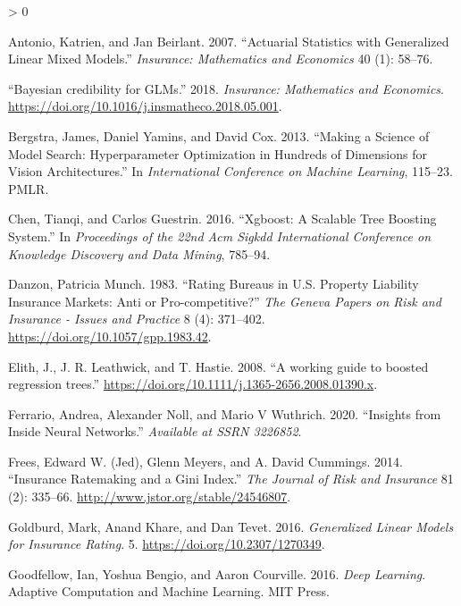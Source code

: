 \documentclass[
]{article}
\newlength{\cslhangindent}
\newenvironment{CSLReferences}[2] %
 {%
  \setlength{\parindent}{0pt}
  \ifodd #1 \everypar{\setlength{\hangindent}{\cslhangindent}}\ignorespaces\fi
  \ifnum #2 > 0
  \setlength{\parskip}{#2\baselineskip}
  \fi
 }%
 {}
\begin{document}
\hypertarget{refs}{}
\begin{CSLReferences}{1}{0}
\leavevmode\hypertarget{ref-antonio2007actuarial}{}%
Antonio, Katrien, and Jan Beirlant. 2007. {``Actuarial Statistics with
Generalized Linear Mixed Models.''} \emph{Insurance: Mathematics and
Economics} 40 (1): 58--76.

\leavevmode\hypertarget{ref-Xacur2018}{}%
{``{Bayesian credibility for GLMs}.''} 2018. \emph{Insurance:
Mathematics and Economics}.
\url{https://doi.org/10.1016/j.insmatheco.2018.05.001}.

\leavevmode\hypertarget{ref-bergstra2013making}{}%
Bergstra, James, Daniel Yamins, and David Cox. 2013. {``Making a Science
of Model Search: Hyperparameter Optimization in Hundreds of Dimensions
for Vision Architectures.''} In \emph{International Conference on
Machine Learning}, 115--23. PMLR.

\leavevmode\hypertarget{ref-chen2016xgboost}{}%
Chen, Tianqi, and Carlos Guestrin. 2016. {``Xgboost: A Scalable Tree
Boosting System.''} In \emph{Proceedings of the 22nd Acm Sigkdd
International Conference on Knowledge Discovery and Data Mining},
785--94.

\leavevmode\hypertarget{ref-Danzon1983}{}%
Danzon, Patricia Munch. 1983. {``{Rating Bureaus in U.S. Property
Liability Insurance Markets: Anti or Pro-competitive?}''} \emph{The
Geneva Papers on Risk and Insurance - Issues and Practice} 8 (4):
371--402. \url{https://doi.org/10.1057/gpp.1983.42}.

\leavevmode\hypertarget{ref-Elith2008}{}%
Elith, J., J. R. Leathwick, and T. Hastie. 2008. {``{A working guide to
boosted regression trees}.''}
\url{https://doi.org/10.1111/j.1365-2656.2008.01390.x}.

\leavevmode\hypertarget{ref-ferrario2020insights}{}%
Ferrario, Andrea, Alexander Noll, and Mario V Wuthrich. 2020.
{``Insights from Inside Neural Networks.''} \emph{Available at SSRN
3226852}.

\leavevmode\hypertarget{ref-giniFrees}{}%
Frees, Edward W. (Jed), Glenn Meyers, and A. David Cummings. 2014.
{``Insurance Ratemaking and a Gini Index.''} \emph{The Journal of Risk
and Insurance} 81 (2): 335--66.
\url{http://www.jstor.org/stable/24546807}.

\leavevmode\hypertarget{ref-goldburd2016generalized}{}%
Goldburd, Mark, Anand Khare, and Dan Tevet. 2016. \emph{{Generalized
Linear Models for Insurance Rating}}. 5.
\url{https://doi.org/10.2307/1270349}.

\leavevmode\hypertarget{ref-Goodfellow-et-al-2016}{}%
Goodfellow, Ian, Yoshua Bengio, and Aaron Courville. 2016. \emph{{Deep
Learning}}. Adaptive Computation and Machine Learning. MIT Press.


\end{CSLReferences}
\end{document}
